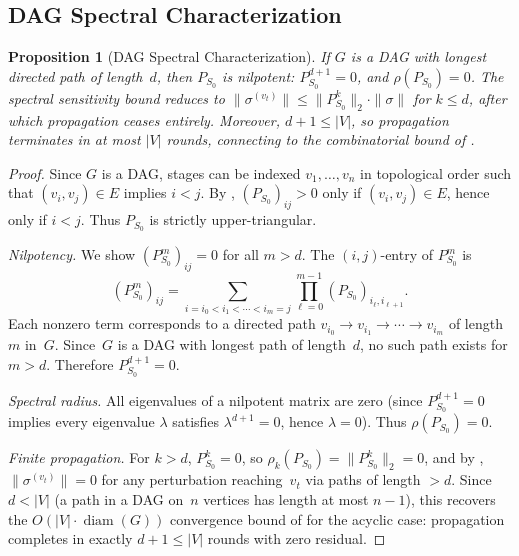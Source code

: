\documentclass[11pt,a4paper]{article}
\newtheorem{proposition}[theorem]{Proposition}
\theoremstyle{definition}
\DeclareMathOperator{\diam}{diam}
\newcommand{\specnorm}[1]{\|#1\|_2}
\newcommand{\propmat}{P}
\newcommand{\propmatS}{\propmat_{S_0}}
\begin{document}
\subsection{DAG Spectral Characterization}

\begin{proposition}[DAG Spectral Characterization]\label{prop:dag-spectral}
If $G$ is a DAG with longest directed path of length~$d$, then $\propmatS$ is
nilpotent: $\propmatS^{d+1} = 0$, and $\rho(\propmatS) = 0$.
The spectral sensitivity bound reduces to
$\|\sigma^{(v_t)}\| \leq \specnorm{\propmatS^k} \cdot \|\sigma\|$
for $k \leq d$, after which propagation ceases entirely.
Moreover, $d + 1 \leq |V|$, so propagation terminates in at most $|V|$ rounds,
connecting to the combinatorial bound of .
\end{proposition}

\begin{proof}
Since $G$ is a DAG, stages can be indexed $v_1, \ldots, v_n$ in topological
order such that $(v_i, v_j) \in E$ implies $i < j$.  By ,
$(\propmatS)_{ij} > 0$ only if $(v_i, v_j) \in E$, hence only if $i < j$.
Thus $\propmatS$ is strictly upper-triangular.

\emph{Nilpotency.}  We show $(\propmatS^m)_{ij} = 0$ for all $m > d$.  The
$(i,j)$-entry of $\propmatS^m$ is
\[
  (\propmatS^m)_{ij}
  = \sum_{i = i_0 < i_1 < \cdots < i_m = j}
    \prod_{\ell=0}^{m-1} (\propmatS)_{i_\ell, i_{\ell+1}}.
\]
Each nonzero term corresponds to a directed path
$v_{i_0} \to v_{i_1} \to \cdots \to v_{i_m}$ of length~$m$ in~$G$.
Since~$G$ is a DAG with longest path of length~$d$, no such path exists
for $m > d$.  Therefore $\propmatS^{d+1} = 0$.

\emph{Spectral radius.}  All eigenvalues of a nilpotent matrix are zero
(since $\propmatS^{d+1} = 0$ implies every eigenvalue $\lambda$ satisfies
$\lambda^{d+1} = 0$, hence $\lambda = 0$).
Thus $\rho(\propmatS) = 0$.

\emph{Finite propagation.}  For $k > d$, $\propmatS^k = 0$, so
$\rho_k(\propmatS) = \specnorm{\propmatS^k} = 0$, and by
, $\|\sigma^{(v_t)}\| = 0$ for any perturbation
reaching~$v_t$ via paths of length $> d$.  Since $d < |V|$ (a path in
a DAG on~$n$ vertices has length at most $n - 1$), this recovers the
$O(|V| \cdot \diam(G))$ convergence bound of 
for the acyclic case: propagation completes in exactly $d + 1 \leq |V|$
rounds with zero residual.
\end{proof}
\end{document}
